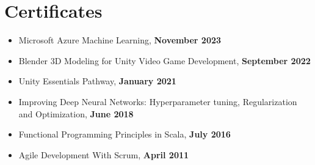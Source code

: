 \section*{Certificates}

\begin{itemize}[noitemsep, nosep]
  \item Microsoft Azure Machine Learning, \textbf{November 2023}
  \item Blender 3D Modeling for Unity Video Game Development, \textbf{September 2022}
  \item Unity Essentials Pathway, \textbf{January 2021}
  \item Improving Deep Neural Networks: Hyperparameter tuning, Regularization and Optimization, \textbf{June 2018}
  \item Functional Programming Principles in Scala, \textbf{July 2016}
  \item Agile Development With Scrum, \textbf{April 2011}
\end{itemize}
